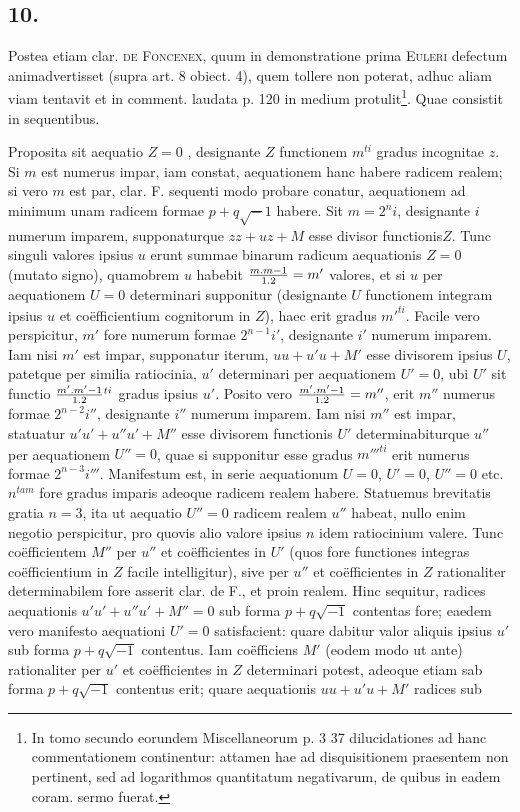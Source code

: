 \documentclass[twoside,12pt, showframe]{memoir}
\let\oldfrac\frac
\def\frac#1#2{\mathchoice{\tfrac{#1}{#2}}{\oldfrac{#1}{#2}}{\genfrac{}{}{}{2}{#1}{#2\mathstrut}}{\genfrac{}{}{}{3}{#1}{#2\mathstrut}}}
\begin{document}
\subsection*{10.}

Postea etiam clar. \textsc{de Foncenex}, quum in demonstratione prima \textsc{Euleri} defectum animadvertisset (supra art. 8 obiect. 4), quem tollere non poterat, adhuc aliam viam tentavit et in comment. laudata p. 120 in medium protulit\footnote{In tomo secundo eorundem Miscellaneorum p. 3 37 dilucidationes ad hanc commentationem continentur: attamen hae ad disquisitionem praesentem non pertinent, sed ad logarithmos quantitatum negativarum, de quibus in eadem coram. sermo fuerat.}. Quae consistit in sequentibus.

Proposita sit aequatio \(Z = 0\) , designante \(Z\) functionem \(m^{ti}\) gradus incognitae \(z\). Si \(m\) est numerus impar, iam constat, aequationem hanc habere radicem realem; si vero \(m\) est par, clar. \textsc{F.} sequenti modo probare conatur, aequationem ad minimum unam radicem formae \(p+q\surd-1\) habere. Sit \(m=2^n i\), designante \(i\) numerum imparem, supponaturque \(zz + uz + M\) esse divisor functionis\(Z\). Tunc singuli valores ipsius \(u\) erunt summae binarum radicum aequationis \(Z = 0\) (mutato signo), quamobrem \(u\) habebit \(\frac{m . m-1}{1 . 2} = m'\) valores, et si \(u\) per aequationem \(U=0\) determinari supponitur (designante \(U\) functionem integram ipsius \(u\) et co\"efficientium cognitorum in \(Z\)), haec erit gradus \({m'}^{ti}\). Facile vero perspicitur, \(m'\) fore numerum formae \(2^{n-1} i' \), designante \(i'\) numerum imparem. Iam nisi \(m'\) est impar, supponatur iterum, \(uu + u'u + M'\) esse divisorem ipsius \(U\), patetque per similia ratiocinia, \(u'\) determinari per aequationem \(U'= 0\), ubi \(U'\) sit functio \(\frac{m' . m'-1}{1 . 2}^{ti}\) gradus ipsius \(u'\). Posito vero \(\frac{m' . m'-1}{1 . 2} = m''\), erit \(m''\) numerus formae \(2^{n-2}i''\), designante \(i''\) numerum imparem. Iam nisi \(m''\) est impar, statuatur \(u'u'+u''u'+M''\) esse divisorem functionis \(U'\) determinabiturque \(u''\) per aequationem \(U'' = 0\), quae si supponitur esse gradus \({m'''}^{ti}\) erit numerus formae \(2^{n-3}i'''\). Manifestum est, in serie aequationum \(U=0\), \(U'=0\), \(U''=0\) etc{.} \(n^{tam}\) fore gradus imparis adeoque radicem realem habere. Statuemus brevitatis gratia \(n = 3\), ita ut aequatio \(U'' = 0\) radicem realem \(u''\) habeat, nullo enim negotio perspicitur, pro quovis alio valore ipsius \(n\) idem ratiocinium valere. Tunc co\"efficientem \(M''\) per \(u''\) et co\"efficientes in \(U'\) (quos fore functiones integras co\"efficientium in \(Z\) facile intelligitur), sive per \(u''\) et co\"efficientes in \(Z\) rationaliter determinabilem fore asserit clar. de \textsc{F.}, et proin realem. Hinc sequitur, radices aequationis \(u'u'+u''u'+M''=0\) sub forma \(p+q\surd{-1}\) contentas fore; eaedem vero manifesto aequationi \(U' = 0\) satisfacient: quare dabitur valor aliquis ipsius \(u'\) sub forma \(p+q\surd{-1}\) contentus. Iam co\"efficiens \(M'\) (eodem modo ut ante) rationaliter per \(u'\) et co\"efficientes in \(Z\) determinari potest, adeoque etiam sab forma \(p+q\surd{-1}\) contentus erit; quare aequationis \(uu+u'u+M'\) radices sub 
\end{document}
